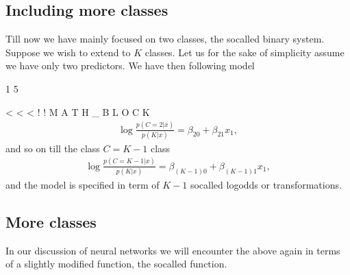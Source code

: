 \documentclass[letterpaper,10pt,english]{sphinxmanual}
\begin{document}
\subsection{Including more classes}
\label{\detokenize{chapter5:including-more-classes}}
Till now we have mainly focused on two classes, the so\sphinxhyphen{}called binary
system. Suppose we wish to extend to \(K\) classes.  Let us for the sake
of simplicity assume we have only two predictors. We have then
following model

1
5

\textless{}
\textless{}
\textless{}
!
!
M
A
T
H
\_
B
L
O
C
K
\begin{equation*}
\begin{split}
\log{\frac{p(C=2\vert x)}{p(K\vert x)}} = \beta_{20}+\beta_{21}x_1,
\end{split}
\end{equation*}
and so on till the class \(C=K-1\) class
\begin{equation*}
\begin{split}
\log{\frac{p(C=K-1\vert x)}{p(K\vert x)}} = \beta_{(K-1)0}+\beta_{(K-1)1}x_1,
\end{split}
\end{equation*}
and the model is specified in term of \(K-1\) so\sphinxhyphen{}called log\sphinxhyphen{}odds or
 transformations.


\subsection{More classes}
\label{\detokenize{chapter5:more-classes}}
In our discussion of neural networks we will encounter the above again
in terms of a slightly modified function, the so\sphinxhyphen{}called  function.
\end{document}
